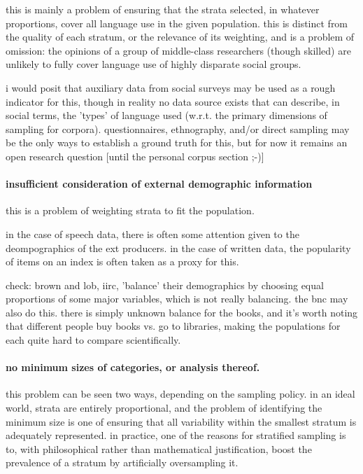 this is mainly a problem of ensuring that the strata selected, in whatever proportions, cover all language use in the given population.  this is distinct from the quality of each stratum, or the relevance of its weighting, and is a problem of omission: the opinions of a group of middle-class researchers (though skilled) are unlikely to fully cover language use of highly disparate social groups.

i would posit that auxiliary data from social surveys may be used as a rough indicator for this, though in reality no data source exists that can describe, in social terms, the 'types' of language used (w.r.t. the primary dimensions of sampling for corpora).  questionnaires, ethnography, and/or direct sampling may be the only ways to establish a ground truth for this, but for now it remains an open research question [until the personal corpus section ;-)]





\paragraph{ insufficient consideration of external demographic information}
this is a problem of weighting strata to fit the population.  

in the case of speech data, there is often some attention given to the deompographics of the ext producers.  in the case of written data, the popularity of items on an index is often taken as a proxy for this.  

check: brown and lob, iirc, 'balance' their demographics by choosing equal proportions of some major variables, which is not really balancing.  the bnc may also do this.  there is simply unknown balance for the books, and it's worth noting that different people buy books vs. go to libraries, making the populations for each quite hard to compare scientifically.



\paragraph{ no minimum sizes of categories, or analysis thereof.}
this problem can be seen two ways, depending on the sampling policy.  in an ideal world, strata are entirely proportional, and the problem of identifying the minimum size is one of ensuring that all variability within the smallest stratum is adequately represented.  in practice, one of the reasons for stratified sampling is to, with philosophical rather than mathematical justification, boost the prevalence of a stratum by artificially oversampling it.

